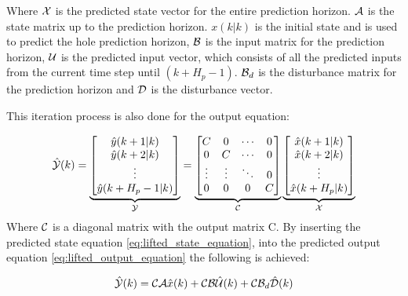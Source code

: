 Where $\CMcal{X}$ is the predicted state vector for the entire prediction horizon. $\CMcal{A}$ is the state matrix up to the prediction horizon. $x(k|k)$ is the initial state and is used to predict the hole prediction horizon, $\CMcal{B}$ is the input matrix for the prediction horizon, $\CMcal{U}$ is the predicted input vector, which consists of all the predicted inputs from the current time step until $(k+H_p-1)$. $\CMcal{B}_d$ is the disturbance matrix for the prediction horizon and $\CMcal{D}$ is the disturbance vector. 

This iteration process is also done for the output equation:

\begin{equation}\label{eq:lifted_output_equation}
	\hat{\CMcal{Y}}(k)= 
	\underbrace{\begin{bmatrix}
	\hat{y}(k+1|k)\\
	\hat{y}(k+2|k)\\
	\vdots\\
	\hat{y}(k+H_p-1|k)
	\end{bmatrix}}_{\CMcal{Y}}
	= 
	\underbrace{\begin{bmatrix}
	C 		& 0 	&\cdots	& 0\\
	0 		& C 	&\cdots & 0 \\
	\vdots	& \vdots&\ddots & 0\\
	0 		& 0		&0 		& C
	\end{bmatrix}}_{\CMcal{C}}
	  \underbrace{\begin{bmatrix}
	  \hat{x}(k+1|k) 	\\
	  \hat{x}(k+2|k) 	\\
	  \vdots 			\\
	  \hat{x}(k+H_p|k) 	\\
	   \end{bmatrix}}_{\CMcal{X}}
\end{equation}
Where $\CMcal{C}$ is a diagonal matrix with the output matrix C. By inserting the predicted state equation \ref{eq:lifted_state_equation}, into the predicted output equation \ref{eq:lifted_output_equation} the following is achieved:

\begin{equation}\label{eq:output_eq_with_state_eq}
	\hat{\CMcal{Y}}(k) =  \CMcal{C}\CMcal{A}\hat{x}(k) +  \CMcal{C}\CMcal{B}\hat{\CMcal{U}}(k) +\CMcal{C}\CMcal{B}_d\hat{\CMcal{D}}(k)
\end{equation}   


